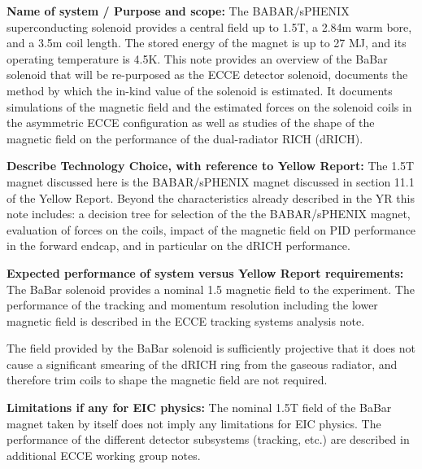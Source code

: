 %

\textbf{Name of system / Purpose and scope:}
The BABAR/sPHENIX superconducting solenoid provides a central field up to 1.5T, a 2.84m warm bore, and a 3.5m coil length. The stored energy of the magnet is up to 27 MJ, and its operating temperature is 4.5K. This note provides an overview of the BaBar solenoid that will be re-purposed as the ECCE detector solenoid, documents the method by which the in-kind value of the solenoid is estimated. It documents simulations of the magnetic field and the estimated forces on the solenoid coils in the asymmetric ECCE configuration as well as studies of the shape of the magnetic field on the performance of the dual-radiator RICH (dRICH). 

\textbf{Describe Technology Choice, with reference to Yellow Report:}
The 1.5T magnet discussed here is the BABAR/sPHENIX magnet discussed in section 11.1 of the Yellow Report. Beyond the characteristics already described in the YR this note includes: a decision tree for selection of the the BABAR/sPHENIX magnet, evaluation of forces on the coils, impact of the magnetic field on PID performance in the forward endcap, and in particular on the dRICH performance.

\textbf{Expected performance of system versus Yellow Report requirements:}
The BaBar solenoid provides 
a nominal 1.5 magnetic field to the experiment. The performance of the tracking and momentum resolution 
including the lower magnetic field is described in the ECCE tracking systems analysis note. 

The field provided by the BaBar solenoid is sufficiently projective that it does not cause a significant smearing of the dRICH ring from the gaseous radiator, and therefore trim coils to shape the magnetic field are not required.  


\textbf{Limitations if any for EIC physics:}
The nominal 1.5T field of the BaBar magnet taken by itself does not imply any limitations for EIC physics.  The performance of the different detector subsystems (tracking, etc.) are described in additional ECCE working group notes. 
